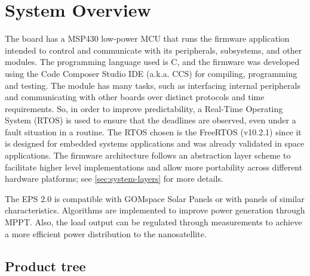 %
%
%
%
%

%
%
%
%
%

\chapter{System Overview} \label{ch:system-overview}

The board has a MSP430 low-power MCU that runs the firmware application intended to control and communicate with its peripherals, subsystems, and other modules. The programming language used is C, and the firmware was developed using the Code Composer Studio IDE (a.k.a. CCS) for compiling, programming and testing. The module has many tasks, such as interfacing internal peripherals and communicating with other boards over distinct protocols and time requirements. 
So, in order to improve predictability, a Real-Time Operating System (RTOS) is used to ensure that the deadlines are observed, even under a fault situation in a routine. The RTOS chosen is the FreeRTOS (v10.2.1) since it is designed for embedded systems applications and was already validated in space applications. The firmware architecture follows an abstraction layer scheme to facilitate higher level implementations and allow more portability across different hardware platforms; see \autoref{sec:system-layers} for more details.

The EPS 2.0 is compatible with GOMspace Solar Panels or with panels of similar characteristics. Algorithms are implemented to improve power generation through MPPT. Also, the load output can be regulated through measurements to achieve a more efficient power distribution to the nanosatellite.

\section{Product tree}

